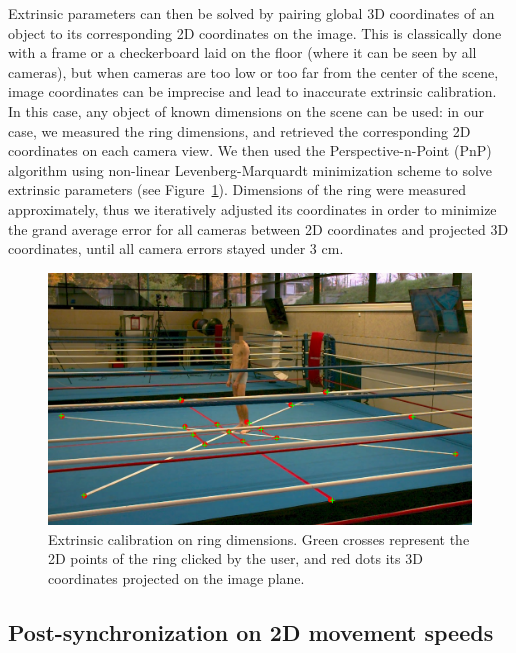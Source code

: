 \newpage
Extrinsic parameters can then be solved by pairing global 3D coordinates of an object to its corresponding 2D coordinates on the image. This is classically done with a frame or a checkerboard laid on the floor (where it can be seen by all cameras), but when cameras are too low or too far from the center of the scene, image coordinates can be imprecise and lead to inaccurate extrinsic calibration. In this case, any object of known dimensions on the scene can be used: in our case, we measured the ring dimensions, and retrieved the corresponding 2D coordinates on each camera view. We then used the Perspective-n-Point (PnP) algorithm using non-linear Levenberg-Marquardt minimization scheme to solve extrinsic parameters \cite{Marchand2015} (see Figure~\ref{fig_calib}). Dimensions of the ring were measured approximately, thus we iteratively adjusted its coordinates in order to minimize the grand average error for all cameras between 2D coordinates and projected 3D coordinates, until all camera errors stayed under 3 cm. 

\begin{figure}[!ht]
	\centering
	\def\svgwidth{1\columnwidth}
	\fontsize{10pt}{10pt}\selectfont
	\includegraphics[width=\linewidth]{"../Chap6/Figures/Fig_Calib.png"}
	\caption{Extrinsic calibration on ring dimensions. Green crosses represent the 2D points of the ring clicked by the user, and red dots its 3D coordinates projected on the image plane.}
	\label{fig_calib}
\end{figure}


\subsection{Post-synchronization on 2D movement speeds}

